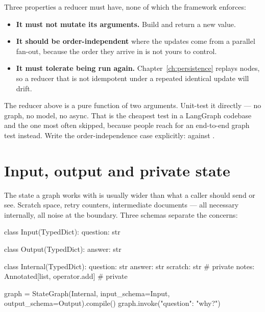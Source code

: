Three properties a reducer must have, none of which the framework enforces:

\begin{itemize}[leftmargin=1.4em,nosep]
\item \textbf{It must not mutate its arguments.} Build and return a new value.
\item \textbf{It should be order-independent} where the updates come from a
      parallel fan-out, because the order they arrive in is not yours to control.
\item \textbf{It must tolerate being run again.} Chapter~\ref{ch:persistence}
      replays nodes, so a reducer that is not idempotent under a repeated
      identical update will drift.
\end{itemize}

\begin{exercisebox}
The reducer above is a pure function of two arguments. Unit-test it directly ---
no graph, no model, no async. That is the cheapest test in a LangGraph codebase
and the one most often skipped, because people reach for an end-to-end graph test
instead. Write the order-independence case explicitly: 
against .
\end{exercisebox}

\section{Input, output and private state}
\label{sec:schemas}

The state a graph works with is usually wider than what a caller should send or
see. Scratch space, retry counters, intermediate documents --- all necessary
internally, all noise at the boundary. Three schemas separate the concerns:

\begin{python}[caption={Narrowing the public surface}, label={lst:schemas}]
class Input(TypedDict):
    question: str


class Output(TypedDict):
    answer: str


class Internal(TypedDict):
    question: str
    answer: str
    scratch: str                          # private
    notes: Annotated[list, operator.add]  # private


graph = StateGraph(Internal, input_schema=Input, output_schema=Output).compile()
graph.invoke({"question": "why?"})
\end{python}

